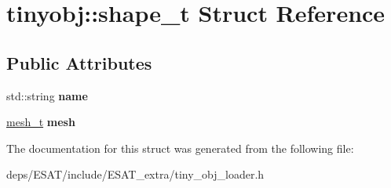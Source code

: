 \hypertarget{structtinyobj_1_1shape__t}{}\section{tinyobj\+:\+:shape\+\_\+t Struct Reference}
\label{structtinyobj_1_1shape__t}
\subsection*{Public Attributes}
\begin{DoxyCompactItemize}
\item 
\mbox{\label{structtinyobj_1_1shape__t_a98650e2e66d00934f68de88eafb34630}} 
std\+::string {\bfseries name}
\item 
\mbox{\label{structtinyobj_1_1shape__t_a3dacb06dfbfe9e245ff4bc7b5b3d9818}} 
\mbox{\hyperlink{structtinyobj_1_1mesh__t}{mesh\+\_\+t}} {\bfseries mesh}
\end{DoxyCompactItemize}


The documentation for this struct was generated from the following file\+:\begin{DoxyCompactItemize}
\item 
deps/\+E\+S\+A\+T/include/\+E\+S\+A\+T\+\_\+extra/tiny\+\_\+obj\+\_\+loader.\+h\end{DoxyCompactItemize}
